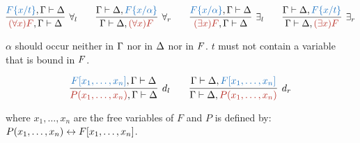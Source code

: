 \begin{scriptsize}
$$
\infer[\forall_l]{\hA{(\forall x)\m{F}},\m{\Gamma}\seq\m{\Delta}}{\hB{\m{F}\subst{x}{t}},\m{\Gamma}\seq\m{\Delta}}
\qquad
\infer[\forall_r]{\m{\Gamma}\seq\m{\Delta},\hA{(\forall x)\m{F}}}{\m{\Gamma}\seq\m{\Delta},\hB{\m{F}\subst{x}{\alpha}}}
\qquad
\infer[\exists_l]{\hA{(\exists x)\m{F}},\m{\Gamma}\seq\m{\Delta}}{\hB{\m{F}\subst{x}{\alpha}},\m{\Gamma}\seq\m{\Delta}}
\qquad
\infer[\exists_r]{\m{\Gamma}\seq\m{\Delta},\hA{(\exists x)\m{F}}}{\m{\Gamma}\seq\m{\Delta},\hB{\m{F}\subst{x}{t}}}
$$
%
\begin{center}
$\alpha$ should occur neither in $\Gamma$ nor in $\Delta$ nor in $F$.
$t$ must not contain a variable that is bound in $F$.
\end{center}


$$
\infer[d_l]{\hA{\m{P(x_1,\ldots, x_n)}},\m{\Gamma}\seq\m{\Delta}}
{\hB{\m{F[x_1,\ldots, x_n]}},\m{\Gamma}\seq\m{\Delta}}
\qquad
\infer[d_r]{\m{\Gamma}\seq\m{\Delta},\hA{\m{P(x_1,\ldots, x_n)}}}
{\m{\Gamma}\seq\m{\Delta},\hB{\m{F[x_1,\ldots, x_n]}}}
$$
%
\begin{center}
where $x_1, \ldots, x_n$ are the free variables of $F$ and $P$ is defined by:
$P(x_1,\ldots, x_n) \leftrightarrow F[x_1,\ldots, x_n]$.
\end{center}
\end{scriptsize}
